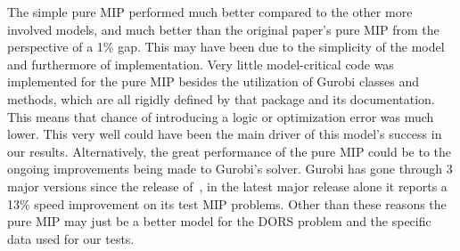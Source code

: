 The simple pure MIP performed much better compared to the other more involved models, and much better than the original paper's pure MIP from the perspective of a 1\% gap. This may have been due to the simplicity of the model and furthermore of implementation. Very little model-critical code was implemented for the pure MIP besides the utilization of Gurobi classes and methods, which are all rigidly defined by that package and its documentation. This means that chance of introducing a logic or optimization error was much lower. This very well could have been the main driver of this model's success in our results. Alternatively, the great performance of the pure MIP could be to the ongoing improvements being made to Gurobi's solver. Gurobi has gone through 3 major versions since the release of~\cite{roshanaei2017propagating},  in the latest major release alone it reports a 13\% speed improvement on its test MIP problems\cite{gurobiBragging}. Other than these reasons the pure MIP may just be a better model for the DORS problem and the specific data used for our tests. 